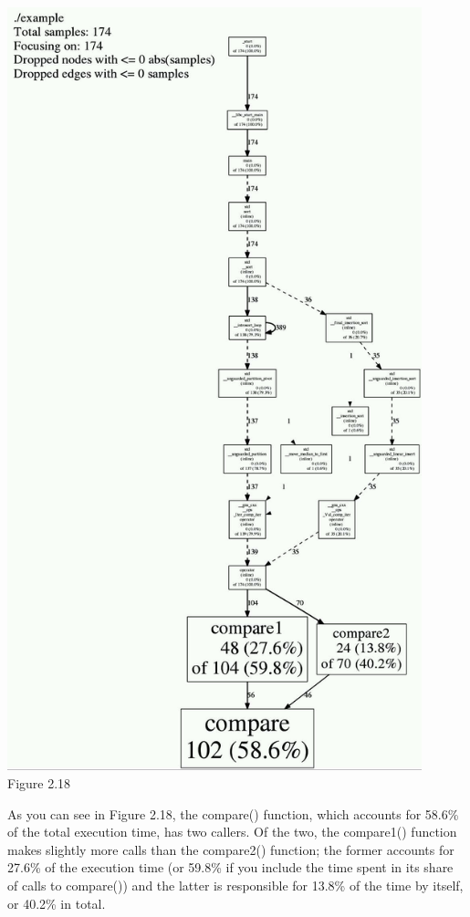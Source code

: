 \hspace*{\fill} \\ %
\begin{center}
\includegraphics[width=0.9\textwidth]{content/1/chapter2/images/18.jpg}\\
Figure 2.18
\end{center}

As you can see in Figure 2.18, the compare() function, which accounts for 58.6\% of the total execution time, has two callers. Of the two, the compare1() function makes slightly more calls than the compare2() function; the former accounts for 27.6\% of the execution time (or 59.8\% if you include the time spent in its share of calls to compare()) and the latter is responsible for 13.8\% of the time by itself, or 40.2\% in total.

